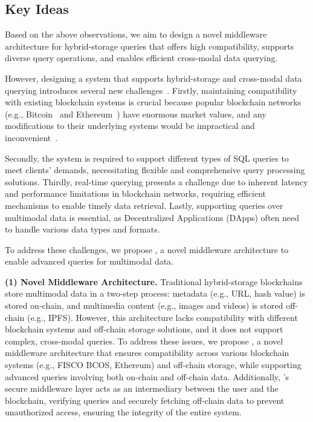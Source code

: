 

\subsection{Key Ideas}
Based on the above observations, we aim to design a novel middleware architecture for hybrid-storage queries that offers high compatibility, supports diverse query operations, and enables efficient cross-modal data querying.


However, designing a system that supports hybrid-storage and cross-modal data querying introduces several new challenges~\cite{MSTDB2023}.
Firstly, maintaining compatibility with existing blockchain systems is crucial because popular blockchain networks (e.g., Bitcoin~\cite{nakamoto2008bitcoin} and Ethereum~\cite{wood2014ethereum}) have enormous market values, and any modifications to their underlying systems would be impractical and inconvenient~\cite{V2FS2024}.


Secondly, the system is required to support different types of SQL queries to meet clients' demands, necessitating flexible and comprehensive query processing solutions. Thirdly, real-time querying presents a challenge due to inherent latency and performance limitations in blockchain networks, requiring efficient mechanisms to enable timely data retrieval. 
Lastly, supporting queries over multimodal data is essential, as Decentralized Applications (DApps) often need to handle various data types and formats.


To address these challenges, we propose \textit{\Chain}, a novel middleware architecture to enable advanced queries for multimodal data. 


\textbf{(1) Novel Middleware Architecture.}  
Traditional hybrid-storage blockchains store multimodal data in a two-step process: metadata (e.g., URL, hash value) is stored on-chain, and multimedia content (e.g., images and videos) is stored off-chain (e.g., IPFS). However, this architecture lacks compatibility with different blockchain systems and off-chain storage solutions, and it does not support complex, cross-modal queries. To address these issues, we propose \Chain, a novel middleware architecture that ensures compatibility across various blockchain systems (e.g., FISCO BCOS, Ethereum) and off-chain storage, while supporting advanced queries involving both on-chain and off-chain data.
Additionally, \Chain's secure middleware layer acts as an intermediary between the user and the blockchain, verifying queries and securely fetching off-chain data to prevent unauthorized access, ensuring the integrity of the entire system.


